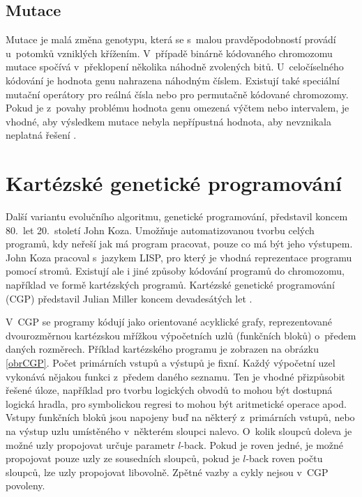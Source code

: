 \subsection{Mutace}

Mutace je malá změna genotypu, která se s~malou pravděpodobností provádí u~potomků vzniklých křížením. V~případě binárně kódovaného chromozomu mutace spočívá v~překlopení několika náhodně zvolených bitů. U~celočíselného kódování je hodnota genu nahrazena náhodným číslem. Existují také speciální mutační operátory pro reálná čísla nebo pro permutačně kódované chromozomy. Pokud je z~povahy problému hodnota genu omezená výčtem nebo intervalem, je vhodné, aby výsledkem mutace nebyla nepřípustná hodnota, aby nevznikala neplatná řešení \cite{Modra}.

\section{Kartézské genetické programování}
\label{secCGP}

Další variantu evolučního algoritmu, genetické programování, představil koncem 80.~let 20.~století John Koza. Umožňuje automatizovanou tvorbu celých programů, kdy neřeší jak má program pracovat, pouze co má být jeho výstupem. John Koza pracoval s~jazykem LISP, pro který je vhodná reprezentace programu pomocí stromů. Existují ale i jiné způsoby kódování programů do chromozomu, například ve formě kartézských programů. Kartézské genetické programování (CGP) představil Julian Miller koncem devadesátých let \cite{Miller2000}.

V~CGP se programy kódují jako orientované acyklické grafy, reprezentované dvourozměrnou kartézskou mřížkou výpočetních uzlů (funkčních bloků) o~předem daných rozměrech. Příklad kartézského programu je zobrazen na obrázku \ref{obrCGP}. Počet primárních vstupů a výstupů je fixní. Každý výpočetní uzel vykonává nějakou funkci z~předem daného seznamu. Ten je vhodné přizpůsobit řešené úloze, například pro tvorbu logických obvodů to mohou být dostupná logická hradla, pro symbolickou regresi to mohou být aritmetické operace apod. Vstupy funkčních bloků jsou napojeny buď na některý z~primárních vstupů, nebo na výstup uzlu umístěného v~některém sloupci nalevo. O~kolik sloupců doleva je možné uzly propojovat určuje parametr $l$-back. Pokud je roven jedné, je možné propojovat pouze uzly ze sousedních sloupců, pokud je $l$-back roven počtu sloupců, lze uzly propojovat libovolně. Zpětné vazby a cykly nejsou v~CGP povoleny.


